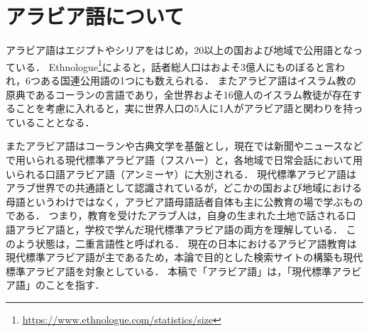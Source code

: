 \documentclass[technicalreport]{ieicej}
\begin{document}
\section{アラビア語について}
アラビア語はエジプトやシリアをはじめ，20以上の国および地域で公用語となっている．
Ethnologue\footnote{\url{https://www.ethnologue.com/statistics/size}}によると，話者総人口はおよそ3億人にものぼると言われ，6つある国連公用語の1つにも数えられる．
またアラビア語はイスラム教の原典であるコーランの言語であり，全世界およそ16億人のイスラム教徒が存在することを考慮に入れると，実に世界人口の5人に1人がアラビア語と関わりを持っていることとなる．

またアラビア語はコーランや古典文学を基盤とし，現在では新聞やニュースなどで用いられる現代標準アラビア語（フスハー）と，各地域で日常会話において用いられる口語アラビア語（アンミーヤ）に大別される．
現代標準アラビア語はアラブ世界での共通語として認識されているが，どこかの国および地域における母語というわけではなく，アラビア語母語話者自体も主に公教育の場で学ぶものである．
つまり，教育を受けたアラブ人は，自身の生まれた土地で話される口語アラビア語と，学校で学んだ現代標準アラビア語の両方を理解している．
このよう状態は，二重言語性と呼ばれる．
現在の日本におけるアラビア語教育は現代標準アラビア語が主であるため，本論で目的とした検索サイトの構築も現代標準アラビア語を対象としている．
本稿で「アラビア語」は，「現代標準アラビア語」のことを指す．
\end{document}
